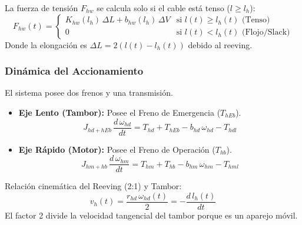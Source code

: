 \documentclass[11pt]{article}                                    %
\begin{document}
La fuerza de tensión $F_{hw}$ se calcula solo si el cable está tenso ($l \ge l_h$):
\begin{equation} \label{eq:tension_izaje}
    F_{hw}(t) = 
    \begin{cases} 
        K_{hw}(l_h) \, \Delta L + b_{hw}(l_h) \, \Delta V & \text{si } l(t) \ge l_h(t) \text{ (Tenso)} \\
        0 & \text{si } l(t) < l_h(t) \text{ (Flojo/Slack)}
    \end{cases}
\end{equation}
Donde la elongación es $\Delta L = 2(l(t) - l_h(t))$ debido al reeving.

\subsubsection{Dinámica del Accionamiento}
El sistema posee dos frenos y una transmisión.
\begin{itemize}
    \item \textbf{Eje Lento (Tambor):} Posee el Freno de Emergencia ($T_{hEb}$).
    \begin{equation}
        J_{hd+hEb} \, \frac{d \, \omega_{hd}}{dt} = T_{hd} + T_{hEb} - b_{hd} \, \omega_{hd} - T_{hdl}
    \end{equation}
    \item \textbf{Eje Rápido (Motor):} Posee el Freno de Operación ($T_{hb}$).
    \begin{equation}
        J_{hm+hb} \, \frac{d \, \omega_{hm}}{dt} = T_{hm} + T_{hb} - b_{hm} \, \omega_{hm} - T_{hml}
    \end{equation}
\end{itemize}

Relación cinemática del Reeving (2:1) y Tambor:
\begin{equation}
    v_h(t) = \frac{r_{hd} \, \omega_{hd}(t)}{2} = -\frac{d \, l_h(t)}{dt}
\end{equation}
El factor 2 divide la velocidad tangencial del tambor porque es un aparejo móvil.
\end{document}
